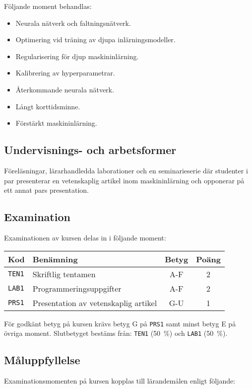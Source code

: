 Följande moment behandlas:

\begin{itemize}
\tightlist
\item
  Neurala nätverk och faltningsnätverk.
\item
  Optimering vid träning av djupa inlärningsmodeller.
\item
  Regularisering för djup maskininlärning.
\item
  Kalibrering av hyperparametrar.
\item
  Återkommande neurala nätverk.
\item
  Långt korttidsminne.
\item
  Förstärkt maskininlärning.
\end{itemize}

\subsection*{Undervisnings- och
arbetsformer}

Föreläsningar, lärarhandledda laborationer och en seminarieserie där
studenter i par presenterar en vetenskaplig artikel inom maskininlärning
och opponerar på ett annat pars presentation.

\subsection*{Examination}

Examinationen av kursen delas in i följande moment:

\begin{longtable}[]{@{}llcc@{}}
\toprule
\textsf{Kod} & \textsf{Benämning} & \textsf{Betyg} & \textsf{Poäng}\tabularnewline
\midrule
\endhead
\texttt{TEN1} & Skriftlig tentamen & A-F & 2\tabularnewline
\texttt{LAB1} & Programmeringsuppgifter & A-F & 2\tabularnewline
\texttt{PRS1} & Presentation av vetenskaplig artikel & G-U & 1\tabularnewline
\bottomrule
\end{longtable}

För godkänt betyg på kursen krävs betyg G på \texttt{PRS1} samt minst betyg E på
övriga moment. Slutbetyget bestäms från: \texttt{TEN1} (50~\%) och \texttt{LAB1} (50~\%).

\subsection*{Måluppfyllelse}

Examinationsmomenten på kursen kopplas till lärandemålen enligt
följande:

